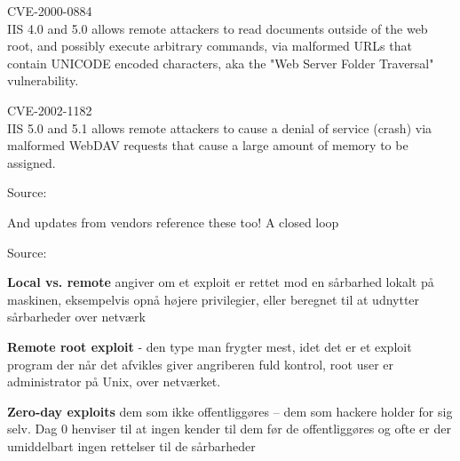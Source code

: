 \documentclass[Screen16to9,17pt]{foils}
\begin{document}

\begin{list1}
\item \small CVE-2000-0884\\
IIS 4.0 and 5.0 allows remote attackers to read documents outside of
the web root, and possibly execute arbitrary commands, via malformed
URLs that contain UNICODE encoded characters, aka the "Web Server
Folder Traversal" vulnerability.

\item \small CVE-2002-1182\\
IIS 5.0 and 5.1 allows remote attackers to cause a denial of service
(crash) via malformed WebDAV requests that cause a large amount of
memory to be assigned.

\item Source:\\
\end{list1}

\centerline{And updates from vendors reference these too! A closed loop}





Source:



\begin{list1}
\item {\bfseries Local vs. remote}
angiver om et exploit er rettet mod
en sårbarhed lokalt på maskinen, eksempelvis
opnå højere privilegier, eller beregnet
til at udnytter sårbarheder over netværk
\item {\bfseries Remote root exploit}
- den type man frygter mest, idet
det er et exploit program der når det afvikles giver
angriberen fuld kontrol, root user er administrator
på Unix, over netværket.
\item {\bfseries Zero-day exploits} dem som ikke offentliggøres -- dem
  som hackere holder for sig selv. Dag 0 henviser til at ingen kender
  til dem før de offentliggøres og ofte er der umiddelbart ingen
  rettelser til de sårbarheder
\end{list1}

\end{document}
